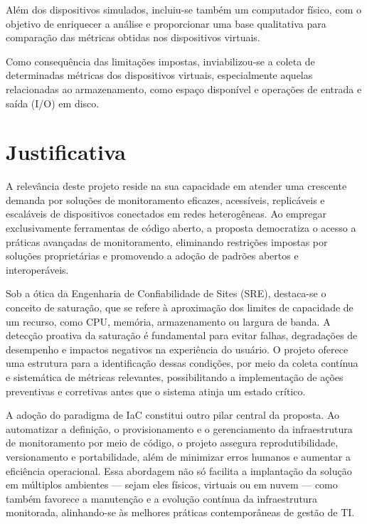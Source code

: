 Além dos dispositivos simulados, incluiu-se também um computador físico, com o objetivo de enriquecer a análise e proporcionar uma base qualitativa para comparação das métricas obtidas nos dispositivos virtuais.

Como consequência das limitações impostas, inviabilizou-se a coleta de determinadas métricas dos dispositivos virtuais, especialmente aquelas relacionadas ao armazenamento, como espaço disponível e operações de entrada e saída (I/O) em disco.

\section{Justificativa}
\label{section:Justificativa}

A relevância deste projeto reside na sua capacidade em atender uma crescente demanda por soluções de monitoramento eficazes, acessíveis, replicáveis e escaláveis de dispositivos conectados em redes heterogêneas. Ao empregar exclusivamente ferramentas de código aberto, a proposta democratiza o acesso a práticas avançadas de monitoramento, eliminando restrições impostas por soluções proprietárias e promovendo a adoção de padrões abertos e interoperáveis.

Sob a ótica da Engenharia de Confiabilidade de Sites (SRE), destaca-se o conceito de saturação, que se refere à aproximação dos limites de capacidade de um recurso, como CPU, memória, armazenamento ou largura de banda.  A detecção proativa da saturação é fundamental para evitar falhas, degradações de desempenho e impactos negativos na experiência do usuário. O projeto oferece uma estrutura para a identificação dessas condições, por meio da coleta contínua e sistemática de métricas relevantes, possibilitando a implementação de ações preventivas e corretivas antes que o sistema atinja um estado crítico.

A adoção do paradigma de IaC constitui outro pilar central da proposta. Ao automatizar a definição, o provisionamento e o gerenciamento da infraestrutura de monitoramento por meio de código, o projeto assegura reprodutibilidade, versionamento e portabilidade, além de minimizar erros humanos e aumentar a eficiência operacional. Essa abordagem não só facilita a implantação da solução em múltiplos ambientes --- sejam eles físicos, virtuais ou em nuvem --- como também favorece a manutenção e a evolução contínua da infraestrutura monitorada, alinhando-se às melhores práticas contemporâneas de gestão de TI.

